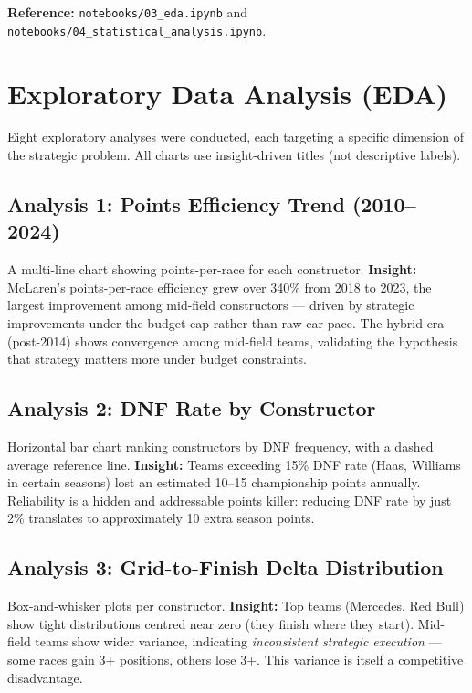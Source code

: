 \documentclass[12pt, a4paper]{article}
\begin{document}
\textbf{Reference:} \texttt{notebooks/03\_eda.ipynb} and \texttt{notebooks/04\_statistical\_analysis.ipynb}.

\newpage

\section{Exploratory Data Analysis (EDA)}

Eight exploratory analyses were conducted, each targeting a specific dimension of the strategic problem. All charts use insight-driven titles (not descriptive labels).

\subsection{Analysis 1: Points Efficiency Trend (2010--2024)}
A multi-line chart showing points-per-race for each constructor. \textbf{Insight:} McLaren's points-per-race efficiency grew over 340\% from 2018 to 2023, the largest improvement among mid-field constructors --- driven by strategic improvements under the budget cap rather than raw car pace. The hybrid era (post-2014) shows convergence among mid-field teams, validating the hypothesis that strategy matters more under budget constraints.

\subsection{Analysis 2: DNF Rate by Constructor}
Horizontal bar chart ranking constructors by DNF frequency, with a dashed average reference line. \textbf{Insight:} Teams exceeding 15\% DNF rate (Haas, Williams in certain seasons) lost an estimated 10--15 championship points annually. Reliability is a hidden and addressable points killer: reducing DNF rate by just 2\% translates to approximately 10 extra season points.

\subsection{Analysis 3: Grid-to-Finish Delta Distribution}
Box-and-whisker plots per constructor. \textbf{Insight:} Top teams (Mercedes, Red Bull) show tight distributions centred near zero (they finish where they start). Mid-field teams show wider variance, indicating \textit{inconsistent strategic execution} --- some races gain 3+ positions, others lose 3+. This variance is itself a competitive disadvantage.
\end{document}
